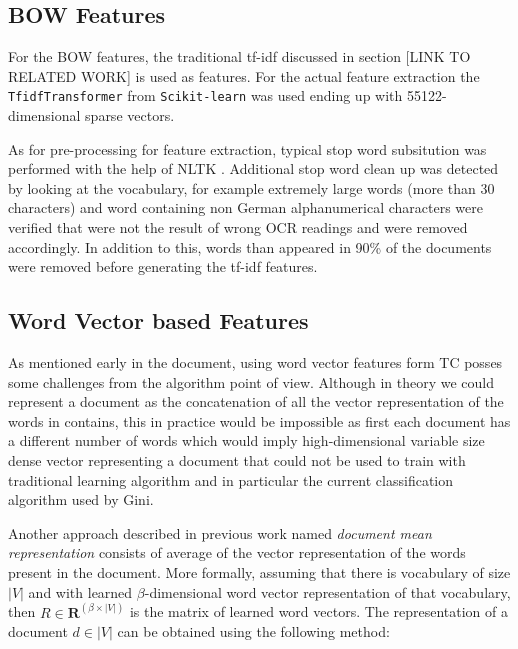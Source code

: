 \subsection{\ac{BOW} Features}
\label{sec:sub_w2v4tc_bow_features}

For the \ac{BOW} features, the traditional \ac{tf-idf}  
\cite{Salton88term-weightingapproaches}\cite{Sebastiani02} discussed in
section [LINK TO RELATED WORK] is used as features. For the actual feature
extraction the \texttt{TfidfTransformer} from \texttt{Scikit-learn}
\cite{scikit-learn}  was used ending up with 55122-dimensional sparse
vectors.

As for  pre-processing for feature extraction,  typical stop word subsitution was performed with the help
of \ac{NLTK} \cite{BirdKleinLoper09}. Additional stop word clean up was
detected by looking at the vocabulary, for example extremely large words
(more than 30 characters) and word containing non German alphanumerical
characters were verified that were not the result of wrong OCR
readings and were removed accordingly. In addition to this, words than
appeared in 90\% of the documents were removed  before generating the \ac{tf-idf}
features.


\subsection{Word Vector  based Features}
\label{sec:sub_w2v4tc_w2v_based_features}

As mentioned early in the document, using word vector features form \ac{TC}
posses some challenges from the algorithm point of view. Although in theory
we could represent a document as the concatenation of all the vector
representation of the words in contains, this in practice would be impossible
as first each document has a different number of words which would imply
high-dimensional variable size dense vector representing a document that
could not be used to train with traditional learning algorithm and in
particular the current classification algorithm used by Gini.

Another approach described in previous work \cite{maas2011learning}  named \textit{document mean
  representation} consists of average of the vector representation of the  words
present in the document.  More formally, assuming that there is  vocabulary of
size $|V|$ and with learned $\beta$-dimensional word vector representation of
that vocabulary, then  $R  \in \mathbf{R}^{(\beta \times |V|)}$  is  the
matrix of learned word vectors.  The representation of a document $d \in |V|$ can be obtained using the following method:

